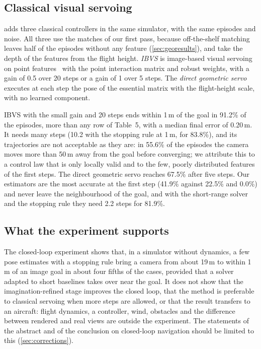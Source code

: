 \documentclass[10pt,twocolumn,letterpaper]{article}
\begin{document}
\subsection{Classical visual servoing}
\label{sec:servo}

 adds three classical controllers in the same simulator, with the same episodes and noise. All three use the matches of our first pass, because off-the-shelf matching leaves half of the episodes without any feature (\cref{sec:georesults}), and take the depth of the features from the flight height. \emph{IBVS} is image-based visual servoing on point features~\cite{chaumette2006visual} with the point interaction matrix and robust weights, with a gain of 0.5 over 20 steps or a gain of 1 over 5 steps. The \emph{direct geometric servo} executes at each step the pose of the essential matrix with the flight-height scale, with no learned component.

IBVS with the small gain and 20 steps ends within 1\,m of the goal in 91.2\% of the episodes, more than any row of Table~5, with a median final error of 0.20\,m. It needs many steps (10.2 with the stopping rule at 1\,m, for 83.8\%), and its trajectories are not acceptable as they are: in 55.6\% of the episodes the camera moves more than 50\,m away from the goal before converging; we attribute this to a control law that is only locally valid and to the few, poorly distributed features of the first steps. The direct geometric servo reaches 67.5\% after five steps. Our estimators are the most accurate at the first step (41.9\% against 22.5\% and 0.0\%) and never leave the neighbourhood of the goal, and with the short-range solver and the stopping rule they need 2.2 steps for 81.9\%.

\subsection{What the experiment supports}
\label{sec:clscope}

The closed-loop experiment shows that, in a simulator without dynamics, a few pose estimates with a stopping rule bring a camera from about 19\,m to within 1\,m of an image goal in about four fifths of the cases, provided that a solver adapted to short baselines takes over near the goal. It does not show that the imagination-refined stage improves the closed loop, that the method is preferable to classical servoing when more steps are allowed, or that the result transfers to an aircraft: flight dynamics, a controller, wind, obstacles and the difference between rendered and real views are outside the experiment. The statements of the abstract and of the conclusion on closed-loop navigation should be limited to this (\cref{sec:corrections}).
\end{document}
